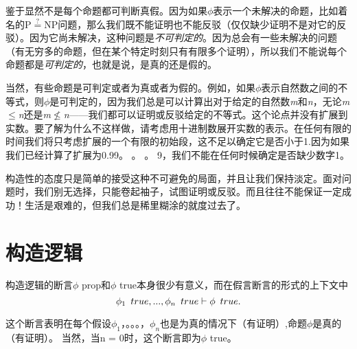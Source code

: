 鉴于显然不是每个命题都可判断真假。因为如果${\phi}$表示一个未解决的命题，比如着名的P${\stackrel{?}{=}}$NP问题，那么我们既不能证明也不能反驳（仅仅缺少证明不是对它的反驳）。因为它尚未解决，这种问题是\textit{不可判定的}。因为总会有一些未解决的问题（有无穷多的命题，但在某个特定时刻只有有限多个证明），所以我们不能说每个命题都是\textit{可判定的}，也就是说，是真的还是假的。


当然，有些命题是可判定或者为真或者为假的。例如，如果${\phi}$表示自然数之间的不等式，则${\phi}$是可判定的，因为我们总是可以计算出对于给定的自然数\textit{m}和\textit{n}，无论\textit{m}${\leq}$\textit{n}还是\textit{m}${\not\leq}$\textit{n}——我们都可以证明或反驳给定的不等式。这个论点并没有扩展到实数。要了解为什么不这样做，请考虑用十进制数展开实数的表示。在任何有限的时间我们将只考虑扩展的一个有限的初始段，这不足以确定它是否小于1.因为如果我们已经计算了扩展为0.99。 。 。 9，我们不能在任何时候确定是否缺少数字1。


构造性的态度只是简单的接受这种不可避免的局面，并且让我们保持淡定。面对问题时，我们别无选择，只能卷起袖子，试图证明或反驳。而且往往不能保证一定成功！生活是艰难的，但我们总是稀里糊涂的就度过去了。
\section{构造逻辑}
构造逻辑的断言${\phi}$ prop和${\phi}$ true本身很少有意义，而在假言断言的形式的上下文中
$$\phi_1\hspace{0.5em}true,...,\phi_n\hspace{0.5em}true \vdash \phi\hspace{0.5em}true.$$


这个断言表明在每个假设${\phi_1}$，。。。，${\phi_n}$也是为真的情况下（有证明）,命题${\phi}$是真的（有证明）。 当然，当n = 0时，这个断言即为${\phi}$ true。

